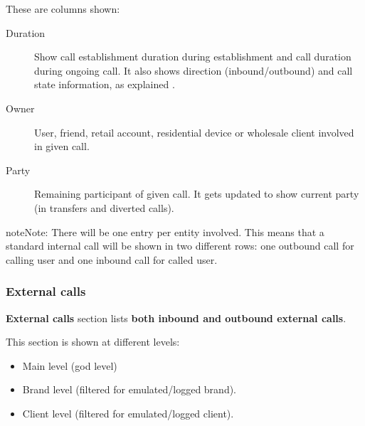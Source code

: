 \documentclass[letterpaper,10pt,english]{sphinxmanual}
\begin{document}
These are columns shown:
\begin{description}
\item[{Duration}] \leavevmode{}\label{administration_portal/client/wholesale/calls/active_calls:term-duration}
Show call establishment duration during establishment and call duration during ongoing call. It also shows
direction (inbound/outbound) and call state information, as explained {\hyperref[administration_portal/platform/active_calls:call\string-state]{}}.

\item[{Owner}] \leavevmode{}\label{administration_portal/client/wholesale/calls/active_calls:term-owner}
User, friend, retail account, residential device or wholesale client involved in given call.

\item[{Party}] \leavevmode{}\label{administration_portal/client/wholesale/calls/active_calls:term-party}
Remaining participant of given call. It gets updated to show current party (in transfers and diverted calls).

\end{description}

\begin{notice}{note}{Note:}
There will be one entry per entity involved. This means that a standard internal call will be shown
in two different rows: one outbound call for calling user and one inbound call for called user.
\end{notice}


\subsubsection{External calls}
\label{administration_portal/client/wholesale/calls/external_calls:id1}\label{administration_portal/client/wholesale/calls/external_calls::doc}\label{administration_portal/client/wholesale/calls/external_calls:external-calls}
\textbf{External calls} section lists \textbf{both inbound and outbound external calls}.

This section is shown at different levels:
\begin{itemize}
\item {} 
Main level (god level)

\item {} 
Brand level (filtered for emulated/logged brand).

\item {} 
Client level (filtered for emulated/logged client).

\end{itemize}
\end{document}
